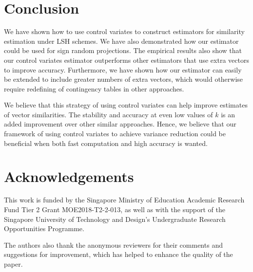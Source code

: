 \documentclass[runningheads]{llncs}
\begin{document}
\section{Conclusion}
    We have shown how to use control variates to construct estimators for similarity estimation under LSH schemes. We have also demonstrated how our estimator could be used for sign random projections. The empirical results also show that our control variates estimator outperforms other estimators that use extra vectors to improve accuracy. Furthermore, we have shown how our estimator can easily be extended to include greater numbers of extra vectors, which would otherwise require redefining of contingency tables in other approaches.
    
    We believe that this strategy of using control variates can help improve estimates of vector similarities. The stability and accuracy at even low values of $k$ is an added improvement over other similar approaches. Hence, we believe that our framework of using control variates to achieve variance reduction could be beneficial when both fast computation and high accuracy is wanted.

\section{Acknowledgements}
    This work is funded by the Singapore Ministry of Education Academic Research Fund Tier 2 Grant MOE2018-T2-2-013, as well as with the support of the Singapore University of Technology and Design's Undergraduate Research Opportunities Programme.

    The authors also thank the anonymous reviewers for their comments and suggestions for improvement, which has helped to enhance the quality of the paper.
%
%
%


%
\end{document}
